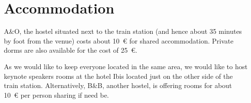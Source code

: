 

\section{Accommodation}

A\&O, the hostel situated next to the train station (and hence about 35 minutes by foot from the venue) costs about \SI{10}{\euro} for shared accommodation. Private dorms are also available for the cost of \SI{25}{\euro}. 

As we would like to keep everyone located in the same area, we would like to host keynote speakers rooms at the hotel Ibis located just on the other side of the train station. 
Alternatively, B\&B, another hostel, is offering rooms for about \SI{10}{\euro} per person sharing if need be. 




